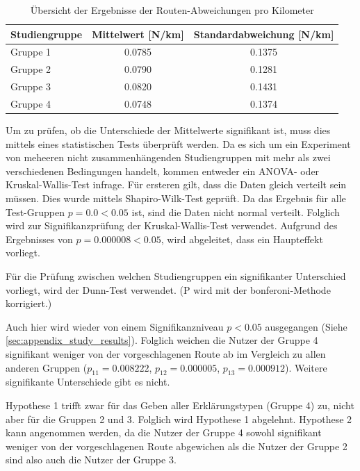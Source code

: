\begin{table}
    \begin{center}
        \begin{tabular}{|l|c|c|}
            \hline
            \textbf{Studiengruppe}  & \textbf{Mittelwert} [N/km] & \textbf{Standardabweichung} [N/km]\\ \hline
            Gruppe 1                & 0.0785 & 0.1375 \\ \hline
            Gruppe 2                & 0.0790 & 0.1281 \\ \hline
            Gruppe 3                & 0.0820 & 0.1431 \\ \hline
            Gruppe 4                & 0.0748 & 0.1374 \\ \hline
        \end{tabular}
    \end{center}
    \caption{Übersicht der Ergebnisse der Routen-Abweichungen pro Kilometer}
    \label{tab:study_offroute_results}
\end{table}

Um zu prüfen, ob die Unterschiede der Mittelwerte signifikant ist, muss dies mittels eines statistischen Tests überprüft werden. Da es sich um ein Experiment von meheeren nicht zusammenhängenden Studiengruppen mit mehr als zwei verschiedenen Bedingungen handelt, kommen entweder ein ANOVA- oder Kruskal-Wallis-Test infrage. Für ersteren gilt, dass die Daten gleich verteilt sein müssen. Dies wurde mittels Shapiro-Wilk-Test geprüft. Da das Ergebnis für alle Test-Gruppen $ p = 0.0 < 0.05 $ ist, sind die Daten nicht normal verteilt. Folglich wird zur Signifikanzprüfung der Kruskal-Wallis-Test verwendet. Aufgrund des Ergebnisses von $ p = 0.000008 < 0.05 $, wird abgeleitet, dass ein Haupteffekt vorliegt.

Für die Prüfung zwischen welchen Studiengruppen ein signifikanter Unterschied vorliegt, wird der Dunn-Test \cite{dunn1964multiple} verwendet. (P wird mit der \glqq bonferoni\grqq{}-Methode korrigiert.)

Auch hier wird wieder von einem Signifikanzniveau $ p < 0.05 $ ausgegangen (Siehe \autoref{sec:appendix_study_results}). Folglich weichen die Nutzer der Gruppe 4 signifikant weniger von der vorgeschlagenen Route ab im Vergleich zu allen anderen Gruppen ($ p_{11} = 0.008222 $, $ p_{12} = 0.000005 $, $ p_{13} = 0.000912 $). Weitere signifikante Unterschiede gibt es nicht.

Hypothese 1 trifft zwar für das Geben aller Erklärungstypen (Gruppe 4) zu, nicht aber für die Gruppen 2 und 3. Folglich wird Hypothese 1 abgelehnt. Hypothese 2 kann angenommen werden, da die Nutzer der Gruppe 4 sowohl signifikant weniger von der vorgeschlagenen Route abgewichen als die Nutzer der Gruppe 2 sind also auch die Nutzer der Gruppe 3.


